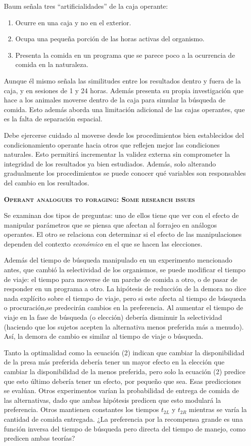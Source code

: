 \documentclass[a4paper,12pt]{article}
\begin{document}
Baum señala tres ``artificialidades'' de la caja operante:
\begin{enumerate}
	\item Ocurre en una caja y no en el exterior.
	\item Ocupa una pequeña porción de las horas activas del organismo.
	\item Presenta la comida en un programa que se parece poco a la ocurrencia de comida en la naturaleza.
\end{enumerate}
Aunque él mismo señala las similitudes entre los resultados dentro y fuera de la caja, y en sesiones de 1 y 24 horas. Además presenta su propia investigación que hace a los animales moverse dentro de la caja para simular la búsqueda de comida. Esto además aborda una limitación adicional de las cajas operantes, que es la falta de separación espacial.

Debe ejercerse cuidado al moverse desde los procedimientos bien establecidos del condicionamiento operante hacia otros que reflejen mejor las condiciones naturales. Esto permitirá incrementar la validez externa sin comprometer la integridad de los resultados ya bien estudiados. Además, solo alterando gradualmente los procedimientos se puede conocer qué variables son responsables del cambio en los resultados.

{\scshape\bfseries Operant analogues to foraging: Some research issues}

Se examinan dos tipos de preguntas: uno de ellos tiene que ver con el efecto de manipular parámetros que se piensa que afectan al forrajeo en análogos operantes. El otro se relaciona con determinar si el efecto de las manipulaciones dependen del contexto {\slshape económico} en el que se hacen las elecciones.

Además del tiempo de búsqueda manipulado en un experimento mencionado antes, que cambió la selectividad de los organismos, se puede modificar el tiempo de viaje: el tiempo para moverse de un parche de comida a otro, o de pasar de responder en un programa a otro. La hipótesis de reducción de la demora no dice nada explícito sobre el tiempo de viaje, pero si este afecta al tiempo de búsqueda o procuración,se predecirán cambios en la preferencia. Al aumentar el tiempo de viaje en la fase de búsqueda (o elección) debería disminuir la selectividad (haciendo que los sujetos acepten la alternativa menos preferida más a menudo). Así, la demora de cambio es similar al tiempo de viaje o búsqueda.

Tanto la optimalidad como la ecuación (2) indican que cambiar la disponibilidad de la presa más preferida debería tener un mayor efecto en la elección que cambiar la disponibilidad de la menos preferida, pero solo la ecuación (2) predice que esto último debería tener un efecto, por pequeño que sea. Esas predicciones se evalúan. Otros experimentos varían la probabilidad de entrega de comida de las alternativas, dado que ambas hipótesis predicen que esto modulará la preferencia. Otros mantienen constantes los tiempos $t_{2L}$ y $t_{2R}$ mientras se varía la cantidad de comida entregada. ¿La preferencia por la recompensa grande es una función inversa del tiempo de búsqueda pero directa del tiempo de manejo, como predicen ambas teorías?
\end{document}
